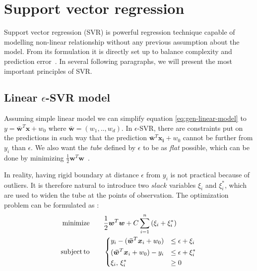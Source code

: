 \section{Support vector regression}
Support vector regression (SVR) is powerful regression technique capable of modelling non-linear relationship without any previous assumption about the model. From its formulation it is directly set up to balance complexity and prediction error~\cite{zhang2020}. In several following paragraphs, we will present the most important principles of SVR.

\subsection*{Linear $\epsilon$-SVR model}
Assuming simple linear model we can simplify equation \ref{eq:gen-linear-model} to $y = \bm{\bar{w}}^T\bm{x} + w_0$ where $\bm{\bar{w}} = (w_1,..,w_d)$. In $\epsilon$-SVR, there are constraints put on the predictions in such way that the prediction $ \bm{\bar{w}}^T\bm{x_i} + w_0$ cannot be further from $y_i$ than $\epsilon$. We also want the \textit{tube} defined by $\epsilon$ to be as \textit{flat} possible, which can be done by minimizing $\frac{1}{2} \bm{w}^T\bm{w}$~\cite{zhang2020}.

In reality, having rigid boundary at distance $\epsilon$ from $y_i$ is not practical because of outliers. It is therefore natural to introduce two $slack$ variables $\xi_i$ and $\xi_i^*$, which are used to widen the tube at the points of observation. The optimization problem can be formulated as \cite{smola2004}:
\begin{align}
	\label{eq:svr1}
	\mathrm{minimize}\qquad & \frac{1}{2}\bm{w}^T\bm{w} + C\sum_{i=1}^{n}\left(\xi_i+\xi_i^*\right)  \\
	\mathrm{subject}\,\mathrm{to}\qquad & 
	\begin{dcases} 
		\label{eq:svr2}
		y_i - (\bm{\bar{w}}^T\bm{x}_i + w_0) 	& \leq \epsilon + \xi_i \\ 
		(\bm{\bar{w}}^T\bm{x}_i + w_0) - y_i  & \leq \epsilon + \xi_i^* \\
		           \xi_i,\,\xi_i^*   		& \geq 0 
	\end{dcases}
\end{align}

